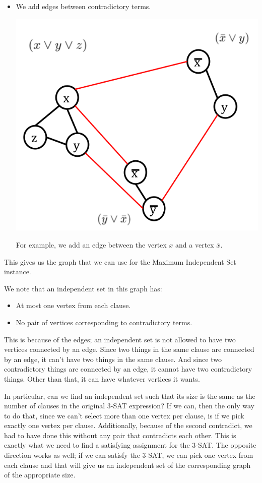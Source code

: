 \documentclass[letterpaper]{article}
\begin{document}
\begin{itemize}
\begin{itemize}
        \item We add edges between contradictory terms.
        \begin{center}
            \includegraphics[scale=0.4]{../assets/3sat_mis_3.png}
        \end{center}
        For example, we add an edge between the vertex $x$ and a vertex $\overline{x}$. 
    \end{itemize}
    This gives us the graph that we can use for the Maximum Independent Set instance. 
\end{itemize}

We note that an independent set in this graph has: 
\begin{itemize}
    \item At most one vertex from each clause. 
    \item No pair of vertices corresponding to contradictory terms. 
\end{itemize}
This is because of the edges; an independent set is not allowed to have two vertices connected by an edge. Since two things in the same clause are connected by an edge, it can't have two things in the same clause. And since two contradictory things are connected by an edge, it cannot have two contradictory things. Other than that, it can have whatever vertices it wants. 

\bigskip 

In particular, can we find an independent set such that its size is the same as the number of clauses in the original 3-SAT expression? If we can, then the only way to do that, since we can't select more than one vertex per clause, is if we pick exactly one vertex per clause. Additionally, because of the second contradict, we had to have done this without any pair that contradicts each other. This is exactly what we need to find a satisfying assignment for the 3-SAT. The opposite direction works as well; if we can satisfy the 3-SAT, we can pick one vertex from each clause and that will give us an independent set of the corresponding graph of the appropriate size. 
\end{document}
